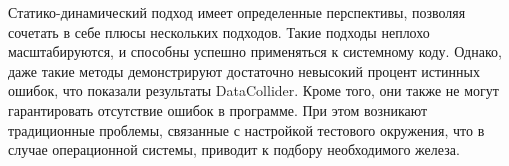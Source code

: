 Статико-динамический подход имеет определенные перспективы, позволяя сочетать в себе плюсы нескольких подходов.
Такие подходы неплохо масштабируются, и способны успешно применяться к системному коду.
Однако, даже такие методы демонстрируют достаточно невысокий процент истинных ошибок, что показали результаты DataCollider.
Кроме того, они также не могут гарантировать отсутствие ошибок в программе.
При этом возникают традиционные проблемы, связанные с настройкой тестового окружения, что в случае операционной системы, приводит к подбору необходимого железа.



